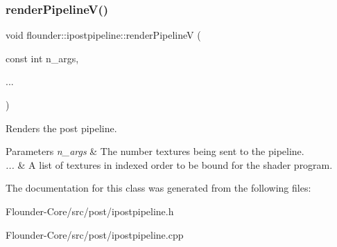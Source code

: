 \mbox{\label{classflounder_1_1ipostpipeline_adb857f2d31022074ed6543f42b6b4c8f}} 
\subsubsection{\texorpdfstring{render\+Pipeline\+V()}{renderPipelineV()}}
{\footnotesize\ttfamily void flounder\+::ipostpipeline\+::render\+PipelineV (\begin{DoxyParamCaption}\item[{const int}]{n\+\_\+args,  }\item[{}]{... }\end{DoxyParamCaption})}



Renders the post pipeline. 


\begin{DoxyParams}{Parameters}
{\em n\+\_\+args} & The number textures being sent to the pipeline. \\
\hline
{\em ...} & A list of textures in indexed order to be bound for the shader program. \\
\hline
\end{DoxyParams}


The documentation for this class was generated from the following files\+:\begin{DoxyCompactItemize}
\item 
Flounder-\/\+Core/src/post/ipostpipeline.\+h\item 
Flounder-\/\+Core/src/post/ipostpipeline.\+cpp\end{DoxyCompactItemize}

